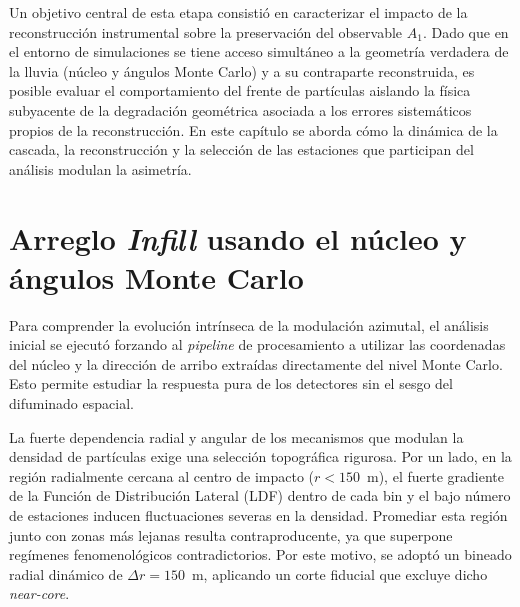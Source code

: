 Un objetivo central de esta etapa consistió en caracterizar el impacto de la reconstrucción instrumental sobre la preservación del observable $A_1$. Dado que en el entorno de simulaciones se tiene acceso simultáneo a la geometría verdadera de la lluvia (núcleo y ángulos Monte Carlo) y a su contraparte reconstruida, es posible evaluar el comportamiento del frente de partículas aislando la física subyacente de la degradación geométrica asociada a los errores sistemáticos propios de la reconstrucción. En este capítulo se aborda cómo la dinámica de la cascada, la reconstrucción y la selección de las estaciones que participan del análisis modulan la asimetría.

\section{Arreglo \textit{Infill} usando el núcleo y ángulos Monte Carlo}
\label{subsec:infill_mc}

Para comprender la evolución intrínseca de la modulación azimutal, el análisis inicial se ejecutó forzando al \textit{pipeline} de procesamiento a utilizar las coordenadas del núcleo y la dirección de arribo extraídas directamente del nivel Monte Carlo. Esto permite estudiar la respuesta pura de los detectores sin el sesgo del difuminado espacial.

La fuerte dependencia radial y angular de los mecanismos que modulan la densidad de partículas exige una selección topográfica rigurosa. %
Por un lado, en la región radialmente cercana al centro de impacto ($r < 150$~m), el fuerte gradiente de la Función de Distribución Lateral (LDF) dentro de cada bin y el bajo número de estaciones inducen fluctuaciones severas en la densidad. Promediar esta región junto con zonas más lejanas resulta contraproducente, ya que superpone regímenes fenomenológicos contradictorios. Por este motivo, se adoptó un bineado radial dinámico de $\Delta r = 150$~m, aplicando un corte fiducial que excluye dicho \textit{near-core}. 

